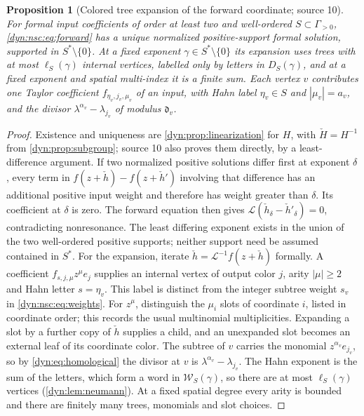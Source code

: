 \documentclass[11pt,letterpaper]{article}
\newtheorem{proposition}[proposition]{Proposition}
\theoremstyle{definition}
\theoremstyle{remark}
\newcommand{\word}{\mathcal W}
\newcommand{\Li}{\mathcal L}
\numberwithin{equation}{section}
\begin{document}
\begin{proposition}[Colored tree expansion of the forward coordinate;
source 10]\label{dyn:nsc:prop:formal}
For formal input coefficients of order at least two and well-ordered
$S\subset\Gamma_{>0}$, \eqref{dyn:nsc:eq:forward} has a unique normalized
positive-support formal solution, supported in $S^{*}\setminus\{0\}$. At a
fixed exponent $\gamma\in S^{*}\setminus\{0\}$ its expansion uses trees with
at most $\ell_S(\gamma)$
internal vertices, labelled only by letters in $D_S(\gamma)$, and at a fixed
exponent and spatial multi-index it is a finite sum. Each vertex $v$
contributes one Taylor coefficient $f_{\eta_v,j_v,\mu_v}$ of an input, with
Hahn label $\eta_v\in S$ and $|\mu_v|=a_v$, and the divisor $\lambda^{\alpha_v}-\lambda_{j_v}$ of
modulus $\mathfrak d_v$.
\end{proposition}
\begin{proof}
Existence and uniqueness are \cref{dyn:prop:linearization} for $H$, with
$\check H=H^{-1}$ from \cref{dyn:prop:subgroup}; source 10 also proves them
directly, by a least-difference argument. If two normalized positive
solutions differ first at exponent $\delta$, every term in
$f(z+\check h)-f(z+\check h')$ involving that difference has an additional
positive input weight and therefore has weight greater than $\delta$.
Its coefficient at $\delta$ is zero. The forward equation then gives
$\Li(\check h_\delta-\check h'_\delta)=0$, contradicting nonresonance.
The least differing exponent exists in the union of the two well-ordered
positive supports; neither support need be assumed contained in $S^{*}$.
For the expansion, iterate
$\check h=\Li^{-1}f(z+\check h)$ formally. A coefficient
$f_{s,j,\mu}z^{\mu}e_j$ supplies an internal vertex of output color $j$,
arity $|\mu|\ge2$ and Hahn letter $s=\eta_v$. This label is distinct
from the integer subtree weight $s_v$ in \eqref{dyn:nsc:eq:weights}.
For $z^\mu$, distinguish the $\mu_i$ slots of coordinate $i$, listed in
coordinate order; this records the usual multinomial multiplicities.
Expanding a slot by a further copy of
$\check h$ supplies a child, and an unexpanded slot becomes an external leaf
of its coordinate color. The subtree of $v$ carries the monomial
$z^{\alpha_v}e_{j_v}$, so by \eqref{dyn:eq:homological} the divisor at $v$
is $\lambda^{\alpha_v}-\lambda_{j_v}$. The Hahn exponent is the sum of the
letters, which form a word in $\word_S(\gamma)$, so there are at most
$\ell_S(\gamma)$ vertices (\cref{dyn:lem:neumann}). At a fixed spatial
degree every arity is bounded and there are finitely many trees, monomials
and slot choices.
\end{proof}
\end{document}
